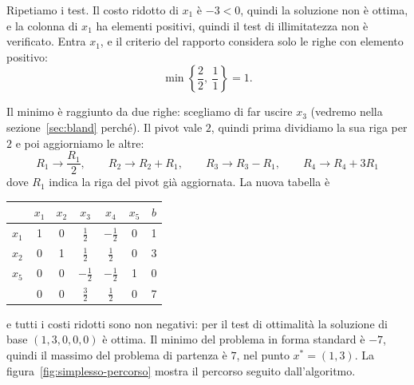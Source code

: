 Ripetiamo i test. Il costo ridotto di $x_1$ è $-3 < 0$, quindi la soluzione non è ottima, e la colonna di $x_1$ ha elementi positivi, quindi il test di illimitatezza non è verificato. Entra $x_1$, e il criterio del rapporto considera solo le righe con elemento positivo:
\[
\min \left\{ \frac{2}{2},\ \frac{1}{1} \right\} = 1.
\]

Il minimo è raggiunto da due righe: scegliamo di far uscire $x_3$ (vedremo nella sezione~\ref{sec:bland} perché). Il pivot vale $2$, quindi prima dividiamo la sua riga per $2$ e poi aggiorniamo le altre:
\[
R_1 \to \frac{R_1}{2}, \qquad R_2 \to R_2 + R_1, \qquad R_3 \to R_3 - R_1, \qquad R_4 \to R_4 + 3R_1
\]
dove $R_1$ indica la riga del pivot già aggiornata. La nuova tabella è
\begin{center}
\begin{tabular}{c|ccccc|c}
 & $x_1$ & $x_2$ & $x_3$ & $x_4$ & $x_5$ & $b$ \\
\hline
$x_1$ & 1 & 0 & $\frac12$ & $-\frac12$ & 0 & 1 \\
$x_2$ & 0 & 1 & $\frac12$ & $\frac12$ & 0 & 3 \\
$x_5$ & 0 & 0 & $-\frac12$ & $-\frac12$ & 1 & 0 \\
\hline
 & 0 & 0 & $\frac32$ & $\frac12$ & 0 & 7 \\
\end{tabular}
\end{center}
e tutti i costi ridotti sono non negativi: per il test di ottimalità la soluzione di base $(1, 3, 0, 0, 0)$ è ottima. Il minimo del problema in forma standard è $-7$, quindi il massimo del problema di partenza è $7$, nel punto $x^* = (1, 3)$. La figura~\ref{fig:simplesso-percorso} mostra il percorso seguito dall'algoritmo.

